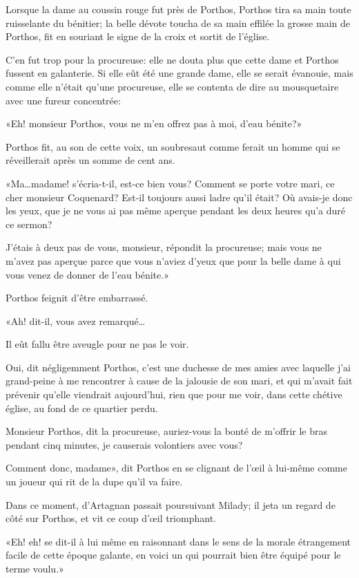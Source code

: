 Lorsque la dame au coussin rouge fut près de Porthos, Porthos tira sa main toute ruisselante du bénitier; la belle dévote toucha de sa main effilée la grosse main de Porthos, fit en souriant le signe de la croix et sortit de l'église. 

C'en fut trop pour la procureuse: elle ne douta plus que cette dame et Porthos fussent en galanterie. Si elle eût été une grande dame, elle se serait évanouie, mais comme elle n'était qu'une procureuse, elle se contenta de dire au mousquetaire avec une fureur concentrée: 

«Eh! monsieur Porthos, vous ne m'en offrez pas à moi, d'eau bénite?» 

Porthos fit, au son de cette voix, un soubresaut comme ferait un homme qui se réveillerait après un somme de cent ans. 

«Ma\dots madame! s'écria-t-il, est-ce bien vous? Comment se porte votre mari, ce cher monsieur Coquenard? Est-il toujours aussi ladre qu'il était? Où avais-je donc les yeux, que je ne vous ai pas même aperçue pendant les deux heures qu'a duré ce sermon? 

\speak  J'étais à deux pas de vous, monsieur, répondit la procureuse; mais vous ne m'avez pas aperçue parce que vous n'aviez d'yeux que pour la belle dame à qui vous venez de donner de l'eau bénite.» 

Porthos feignit d'être embarrassé. 

«Ah! dit-il, vous avez remarqué\dots 

\speak  Il eût fallu être aveugle pour ne pas le voir. 

\speak  Oui, dit négligemment Porthos, c'est une duchesse de mes amies avec laquelle j'ai grand-peine à me rencontrer à cause de la jalousie de son mari, et qui m'avait fait prévenir qu'elle viendrait aujourd'hui, rien que pour me voir, dans cette chétive église, au fond de ce quartier perdu. 

\speak  Monsieur Porthos, dit la procureuse, auriez-vous la bonté de m'offrir le bras pendant cinq minutes, je causerais volontiers avec vous? 

\speak  Comment donc, madame», dit Porthos en se clignant de l'œil à lui-même comme un joueur qui rit de la dupe qu'il va faire. 

Dans ce moment, d'Artagnan passait poursuivant Milady; il jeta un regard de côté sur Porthos, et vit ce coup d'œil triomphant. 

«Eh! eh! se dit-il à lui même en raisonnant dans le sens de la morale étrangement facile de cette époque galante, en voici un qui pourrait bien être équipé pour le terme voulu.» 

